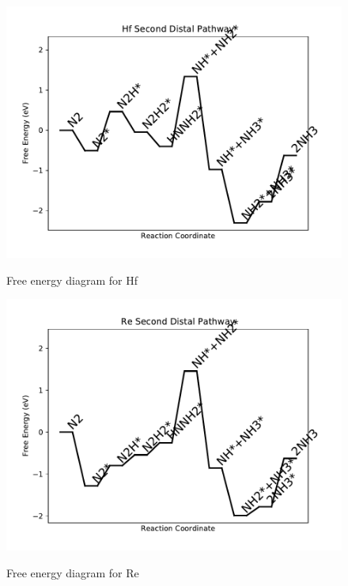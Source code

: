 \documentclass[journal=jacsat,manuscript=article]{achemso}
\begin{document}
\begin{figure}
\includegraphics[width=1\linewidth]{data/plots/Hf_distal_2.pdf}
\label{fig:Hf_distal_2}
\caption{Free energy diagram for Hf}
\end{figure}

\newpage
\begin{figure}
\includegraphics[width=1\linewidth]{data/plots/Re_distal_2.pdf}
\label{fig:Re_distal_2}
\caption{Free energy diagram for Re}
\end{figure}
\end{document}
